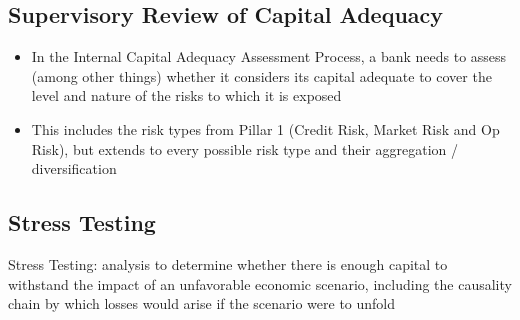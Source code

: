 \subsection*{Supervisory Review of Capital Adequacy}
\begin{itemize}[leftmargin=*]
    \item In the Internal Capital Adequacy Assessment Process, a
bank needs to assess (among other things) whether it
considers its capital adequate to cover the level and
nature of the risks to which it is exposed
    \item This includes the risk types from Pillar 1 (Credit Risk,
Market Risk and Op Risk), but extends to every possible
risk type and their aggregation / diversification
\end{itemize}


\subsection*{Stress Testing}
Stress Testing: analysis to determine whether there is enough capital to withstand the impact of an unfavorable economic scenario, including the causality
chain by which losses would arise if the scenario were to unfold





